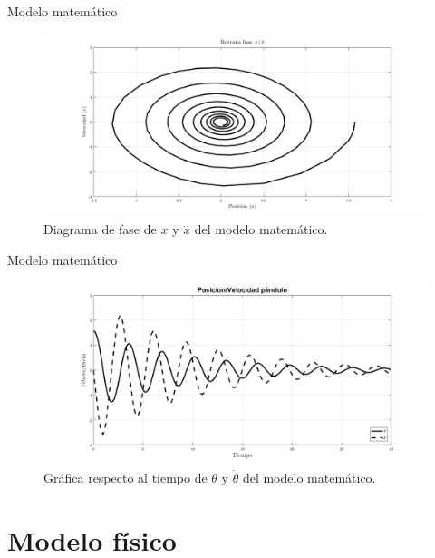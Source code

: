 \documentclass{beamer}
\begin{document}
\begin{frame}{Modelo matemático}
 \begin{figure}[h]
 \centering
 \includegraphics[scale=0.2]{../Report/img/fasependulox2.png}
 \caption{Diagrama de fase de $x$ y $\dot{x}$ del modelo matemático.}
 \label{fig: matlab phase diagram x vx}
\end{figure}

\end{frame}

\begin{frame}{Modelo matemático}
  \begin{figure}[h]
 \centering
 \includegraphics[scale=0.2]{../Report/img/posvelpendulo2.png}
 \caption{Gráfica respecto al tiempo de $\theta$ y $\dot{\theta}$ del modelo matemático.}
 \label{fig: matlab plot x vx}
\end{figure}

\end{frame}


\section{Modelo físico}
\end{document}
